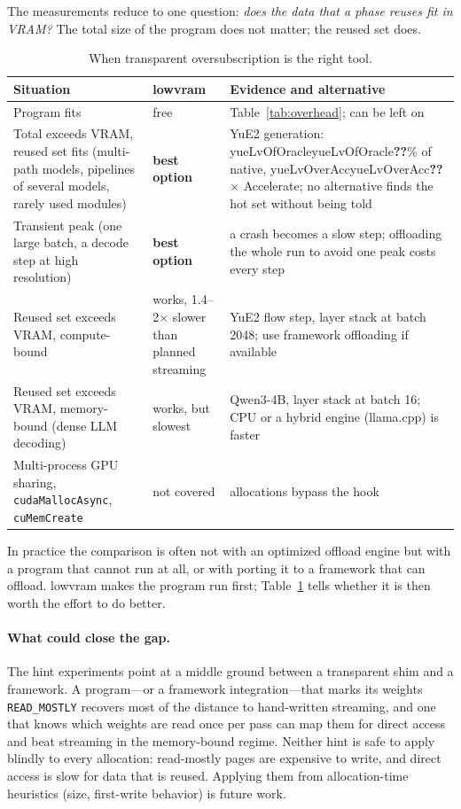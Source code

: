 \documentclass[11pt]{article}
\newcommand{\toprule}{\hline}\newcommand{\midrule}{\hline}\newcommand{\bottomrule}{\hline}%
\providecommand{\na}{\textbf{??}}
\newcommand{\num}[1]{\ifcsname #1\endcsname\csname #1\endcsname\else\na\fi}
\begin{document}
The measurements reduce to one question: \emph{does the data that a phase reuses fit in
VRAM?} The total size of the program does not matter; the reused set does.

\begin{table}[h]
\centering\small
\begin{tabular}{p{4.6cm}p{2.6cm}p{6.6cm}}
\toprule
Situation & lowvram & Evidence and alternative \\
\midrule
Program fits & free & Table~\ref{tab:overhead}; can be left on \\
Total exceeds VRAM, reused set fits (multi-path models, pipelines of several models, rarely used
modules) & \textbf{best option} & YuE2 generation: \num{yueLvOfOracle}\% of native,
\num{yueLvOverAcc}$\times$ Accelerate; no alternative finds the hot set without being told \\
Transient peak (one large batch, a decode step at high resolution) & \textbf{best option} & a
crash becomes a slow step; offloading the whole run to avoid one peak costs every step \\
Reused set exceeds VRAM, compute-bound & works, 1.4--2$\times$ slower than planned streaming &
YuE2 flow step, layer stack at batch 2048; use framework offloading if available \\
Reused set exceeds VRAM, memory-bound (dense LLM decoding) & works, but slowest & Qwen3-4B,
layer stack at batch 16; CPU or a hybrid engine (llama.cpp) is faster \\
Multi-process GPU sharing, \texttt{cudaMallocAsync}, \texttt{cuMemCreate} & not covered & allocations
bypass the hook \\
\bottomrule
\end{tabular}
\caption{When transparent oversubscription is the right tool.}
\label{tab:where}
\end{table}

In practice the comparison is often not with an optimized offload engine but with a program that
cannot run at all, or with porting it to a framework that can offload. lowvram makes the program
run first; Table~\ref{tab:where} tells whether it is then worth the effort to do better.

\paragraph{What could close the gap.} The hint experiments point at a middle ground between a
transparent shim and a framework. A program---or a framework integration---that marks its weights
\texttt{READ\_MOSTLY} recovers most of the distance to hand-written streaming, and one that knows
which weights are read once per pass can map them for direct access and beat streaming in the
memory-bound regime. Neither hint is safe to apply blindly to every allocation: read-mostly pages
are expensive to write, and direct access is slow for data that is reused. Applying them from
allocation-time heuristics (size, first-write behavior) is future work.
\end{document}
